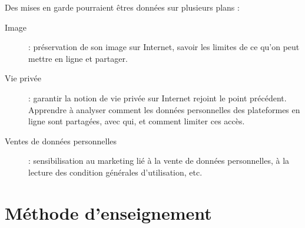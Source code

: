 Des mises en garde pourraient êtres données sur plusieurs plans :

\begin{description}
  \item[Image] : préservation de son image sur Internet, savoir les limites de ce qu'on peut mettre en ligne et partager.
  \item[Vie privée] : garantir la notion de vie privée sur Internet rejoint le point précédent. Apprendre à analyser comment les données personnelles des plateformes en ligne sont partagées, avec qui, et comment limiter ces accès.
  \item[Ventes de données personnelles] : sensibilisation au marketing lié à la vente de données personnelles, à la lecture des condition générales d'utilisation, etc.
\end{description}

\section{Méthode d'enseignement}
